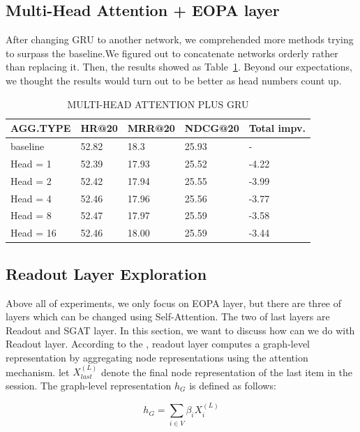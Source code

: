\documentclass{article}
\begin{document}
\subsection{Multi-Head Attention + EOPA layer}
After changing GRU to another network, we comprehended more methods trying to
surpass the baseline.We figured out to concatenate networks orderly
rather than replacing it.
Then, the results showed as Table~\ref{tab:MULTI-HEAD ATTENTION PLUS GRU}.
Beyond our expectations,
we thought the results would turn out to be better as head numbers count up.

\begin{table}
    \caption{MULTI-HEAD ATTENTION PLUS GRU}
    \label{tab:MULTI-HEAD ATTENTION PLUS GRU}
    \centering
    \begin{tabular}{lllll}
        \toprule
        AGG.TYPE  & HR@20 & MRR@20 & NDCG@20 & Total impv. \\
        \midrule
        baseline  & 52.82 & 18.3   & 25.93   & -           \\
        Head = 1  & 52.39 & 17.93  & 25.52   & -4.22       \\
        Head = 2  & 52.42 & 17.94  & 25.55   & -3.99       \\
        Head = 4  & 52.46 & 17.96  & 25.56   & -3.77       \\
        Head = 8  & 52.47 & 17.97  & 25.59   & -3.58       \\
        Head = 16 & 52.46 & 18.00  & 25.59   & -3.44       \\
        \bottomrule
    \end{tabular}
\end{table}

\subsection{Readout Layer Exploration}
Above all of experiments, we only focus on EOPA layer,
but there are three of layers which can be changed using Self-Attention.
The two of last layers are Readout and SGAT layer.
In this section, we want to discuss how can we do with Readout layer.
According to the \cite{chen2020lessr},
readout layer computes a graph-level representation by aggregating node
representations using the attention mechanism.
\cite{chen2020lessr} let $X_{last}^{(L)}$ denote
the final node representation of the last item in the session.
The graph-level representation $h_G$ is defined as follows:

\begin{equation}
    \label{eq:h_G}
    h_G = \sum_{i \in V}\beta_{i}X_{i}^{(L)}
\end{equation}
\end{document}
